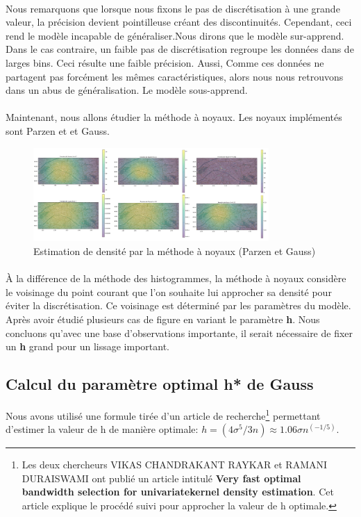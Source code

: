 \documentclass{report}
\begin{document}
\paragraph{}
Nous remarquons que lorsque nous fixons le pas de discrétisation à une grande valeur, la précision devient pointilleuse créant des discontinuités. Cependant, ceci rend le modèle incapable de généraliser.Nous dirons que le modèle sur-apprend. Dans le cas contraire, un faible pas de discrétisation regroupe les données dans de larges bins. Ceci résulte une faible précision. Aussi, Comme ces données ne partagent pas forcément les mêmes caractéristiques, alors  nous nous retrouvons dans un abus de généralisation. Le modèle sous-apprend.
\paragraph{}
Maintenant, nous allons étudier la méthode à noyaux. Les noyaux implémentés sont Parzen et et Gauss.
\begin{figure}[H]
	\begin{center}
		\includegraphics[width=0.8\textwidth]{parzen_vs_gauss.png}
		\caption{Estimation de densité par la méthode à noyaux (Parzen et Gauss)}
	\end{center}
\end{figure}
\paragraph{}
À la différence de la méthode des histogrammes, la méthode à noyaux considère le voisinage du point courant que l'on souhaite lui approcher sa densité pour éviter la discrétisation. Ce voisinage est déterminé par les paramètres du modèle. Après avoir étudié plusieurs cas de figure en variant le paramètre \textbf{h}. Nous concluons qu'avec une base d'observations importante, il serait nécessaire de fixer un \textbf{h} grand pour un lissage important. 
\subsection{Calcul du paramètre optimal h* de Gauss }
Nous avons utilisé une formule tirée d'un article de recherche\footnote{Les deux chercheurs VIKAS CHANDRAKANT RAYKAR et RAMANI DURAISWAMI ont publié un article intitulé \textbf{Very fast optimal bandwidth selection for univariatekernel density estimation}. Cet article explique le procédé suivi pour approcher la valeur de h optimale.} permettant d'estimer la valeur de h de manière optimale: $h=(4\sigma^5/3n) \approx 1.06\sigma n^(-1/5)$.
\end{document}
